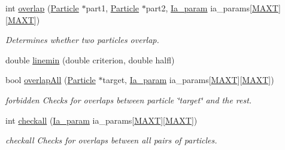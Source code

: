 \begin{DoxyCompactItemize}
int \hyperlink{class_conf_a5e8333ea6a4c8d4ef64f1b675aa61c66}{overlap} (\hyperlink{class_particle}{Particle} $\ast$part1, \hyperlink{class_particle}{Particle} $\ast$part2, \hyperlink{class_ia__param}{Ia\+\_\+param} ia\+\_\+params\mbox{[}\hyperlink{macros_8h_a3f79fdecc884eb98c97d1bdc77455295}{M\+A\+X\+T}\mbox{]}\mbox{[}\hyperlink{macros_8h_a3f79fdecc884eb98c97d1bdc77455295}{M\+A\+X\+T}\mbox{]})
\begin{DoxyCompactList}\small\item\em Determines whether two particles overlap. \end{DoxyCompactList}\item 
double \hyperlink{class_conf_a6e0faf2e313a9b5029d09b1d03523132}{linemin} (double criterion, double halfl)
\item 
bool \hyperlink{class_conf_a70be9b800e58ca0b8a70d8d82bb865b8}{overlap\+All} (\hyperlink{class_particle}{Particle} $\ast$target, \hyperlink{class_ia__param}{Ia\+\_\+param} ia\+\_\+params\mbox{[}\hyperlink{macros_8h_a3f79fdecc884eb98c97d1bdc77455295}{M\+A\+X\+T}\mbox{]}\mbox{[}\hyperlink{macros_8h_a3f79fdecc884eb98c97d1bdc77455295}{M\+A\+X\+T}\mbox{]})
\begin{DoxyCompactList}\small\item\em forbidden Checks for overlaps between particle \char`\"{}target\char`\"{} and the rest. \end{DoxyCompactList}\item 
int \hyperlink{class_conf_ad9286a65f6233e0f25b14a84e23e58b7}{checkall} (\hyperlink{class_ia__param}{Ia\+\_\+param} ia\+\_\+params\mbox{[}\hyperlink{macros_8h_a3f79fdecc884eb98c97d1bdc77455295}{M\+A\+X\+T}\mbox{]}\mbox{[}\hyperlink{macros_8h_a3f79fdecc884eb98c97d1bdc77455295}{M\+A\+X\+T}\mbox{]})
\begin{DoxyCompactList}\small\item\em checkall Checks for overlaps between all pairs of particles. \end{DoxyCompactList}\end{DoxyCompactItemize}
